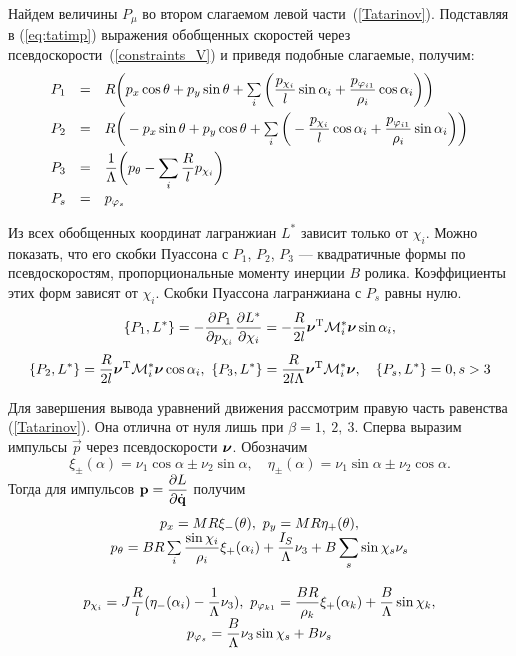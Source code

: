 Найдем величины $P_\mu$ во втором слагаемом левой части~(\ref{Tatarinov}). Подставляя в (\ref{eq:tatimp}) выражения обобщенных скоростей через псевдоскорости~(\ref{constraints_V}) и приведя подобные слагаемые, получим:
\begin{equation}\label{P}
    \begin{array}{rcl}
        P_1 & = & R\bigg(p_x\cos\theta + p_y\sin\theta + \sum\limits_{i}\bigg(\ddfrac{p_{\chi_i}}{l}\sin\alpha_i +  \ddfrac{p_{\phi_{i1}}}{\rho_i}\cos\alpha_i\bigg)\bigg)\vsp
        P_2 & = & R\bigg(-p_x\sin\theta + p_y\cos\theta + \sum\limits_{i}\bigg(-\ddfrac{p_{\chi_i}}{l}\cos\alpha_i +  \ddfrac{p_{\phi_{i1}}}{\rho_i}\sin\alpha_i\bigg)\bigg)\vsp
        P_3 & = & \ddfrac{1}{\Lambda}\bigg(p_\theta - \sum\limits_{i}\ddfrac{R}{l}p_{\chi_i}\bigg)\vsp
        P_s & = & p_{\phi_s}
    \end{array}
\end{equation}

Из всех обобщенных координат лагранжиан $L^{*}$ зависит только от $\chi_i$. Можно показать, что его скобки Пуассона с $P_1$, $P_2$, $P_3$  --- квадратичные формы по псевдоскоростям, пропорциональные моменту инерции $B$ ролика. Коэффициенты этих форм зависят от $\chi_i$. Скобки Пуассона лагранжиана с $P_s$ равны нулю.
$$
\{P_1, L^*\} = -\frac{\partial P_1}{\partial p_{\chi_i}}\frac{\partial L^*}{\partial \chi_i} = -\frac{R}{2l}\boldsymbol{\mathbf{\nu}}^\mathrm{T}\mathcal{M}^*_i\boldsymbol{\mathbf{\nu}}\sin\alpha_i,
$$
$$
\{P_2, L^*\} = \frac{R}{2l}\boldsymbol{\mathbf{\nu}}^\mathrm{T}\mathcal{M}^*_i\boldsymbol{\mathbf{\nu}}\cos\alpha_i,\  
\{P_3, L^*\} = \frac{R}{2l\Lambda}\boldsymbol{\mathbf{\nu}}^\mathrm{T}\mathcal{M}^*_i\boldsymbol{\mathbf{\nu}},\quad \{P_s,L^*\} = 0, s>3
$$

Для завершения вывода уравнений движения рассмотрим правую часть равенства (\ref{Tatarinov}). Она отлична от нуля лишь при $\beta = 1,\ 2,\ 3$. Сперва выразим импульсы $\vec{p}$ через псевдоскорости $\boldsymbol{\mathbf{\nu}}$. Обозначим
$$
    \xi_\pm(\alpha) = \nu_1\cos\alpha \pm \nu_2\sin\alpha, \quad \eta_\pm(\alpha) = \nu_1\sin\alpha \pm \nu_2\cos\alpha.
$$
Тогда для импульсов $\boldsymbol{\mathbf{p}} = \displaystyle\frac{\displaystyle \partial L}{\displaystyle \partial \dot{\boldsymbol{\mathbf{q}}}}$ получим
\begin{equation}\label{p}
    \begin{array}{c}
        p_x  =  MR\xi_-(\theta), \ p_y = MR\eta_+(\theta),\\
        p_\theta  =  BR\sum\limits_i\ddfrac{\sin\chi_i}{\rho_i}\xi_+(\alpha_i) + \ddfrac{I_S}{\Lambda}\nu_3 + B\sum\limits_s\sin\chi_s\nu_s\vsp\\
        p_{\chi_i}  =  J\ddfrac{R}{l}(\eta_-(\alpha_i) - \ddfrac{1}{\Lambda}\nu_3), \ p_{\phi_{k1}}  =  \ddfrac{BR}{\rho_k}\xi_+(\alpha_k)+\ddfrac{B}{\Lambda}\sin\chi_k,\\
        p_{\phi_s}  =  \ddfrac{B}{\Lambda}\nu_3\sin\chi_s + B\nu_s
    \end{array}
\end{equation}

